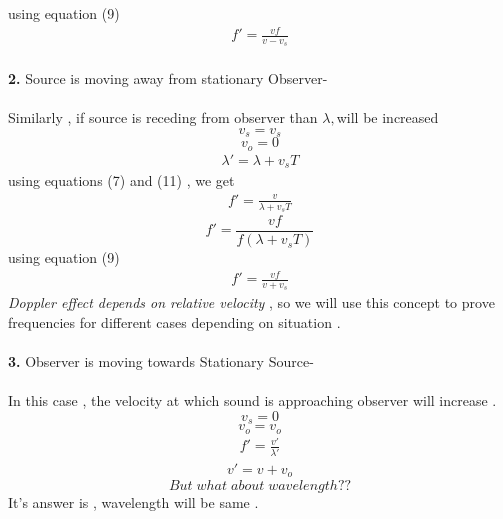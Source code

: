 \documentclass[journal,12pt,twocolumn]{IEEEtran}
\theoremstyle{remark}
\begin{document}
using equation (9)
\begin{align}f' = \frac{v f}{v- v_s }\end{align}
\bigskip\\
\textbf{2.} Source is moving away from stationary Observer-\\\\
Similarly , if source is receding from observer than $\lambda, $will be increased
$$v_s = v_s$$
$$v_o = 0$$
\begin{align}\lambda' = \lambda + v_s T\end{align}
using equations (7) and (11) , we get
\begin{align}f' = \frac{v}{\lambda+ v_s T}\end{align}
$$f' = \frac{v f}{f(\lambda+v_s T)}$$
using equation (9)
\begin{align}f' = \frac{v f}{v+ v_s }\end{align}
\newpage
\textit{Doppler effect depends on relative velocity }, so we will use this concept to prove frequencies for different cases depending on situation .\\\\
\textbf{3.} Observer is moving towards Stationary Source-\\\\
In this case , the velocity at which sound is approaching observer will increase .
$$v_s = 0$$
$$v_o = v_o$$
\begin{align}f' = \frac{v'}{\lambda'}\end{align}
\begin{align}v'= v+v_o\end{align}
$$But \;what\; about\; wavelength??$$
It's answer is , wavelength will be same  .\\
\end{document}
